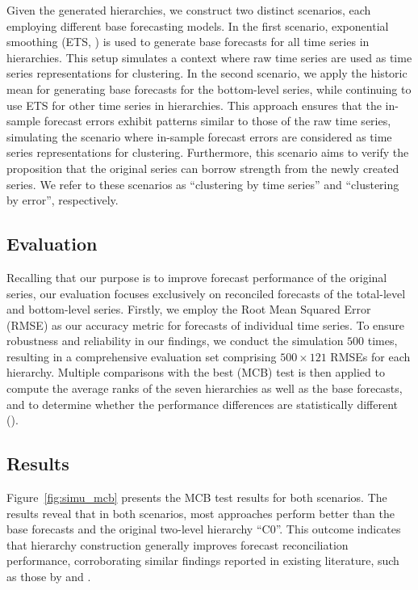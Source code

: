 \documentclass[a4paper,review,12pt,authoryear]{elsarticle}
\begin{document}
Given the generated hierarchies, we construct two distinct scenarios, each employing different base forecasting models. In the first scenario, exponential smoothing (ETS, \citealp{ForecastingExponentialSmoothing}) is used to generate base forecasts for all time series in hierarchies. This setup simulates a context where raw time series are used as time series representations for clustering.
In the second scenario, we apply the historic mean for generating base forecasts for the bottom-level series, while continuing to use ETS for other time series in hierarchies. This approach ensures that the in-sample forecast errors exhibit patterns similar to those of the raw time series, simulating the scenario where in-sample forecast errors are considered as time series representations for clustering. Furthermore, this scenario aims to verify the proposition that the original series can borrow strength from the newly created series. We refer to these scenarios as ``clustering by time series'' and ``clustering by error'', respectively. 


\subsection{Evaluation}
\label{sec:simu_eval}

Recalling that our purpose is to improve forecast performance of the original series, our evaluation focuses exclusively on reconciled forecasts of the total-level and bottom-level series. 
Firstly, we employ the Root Mean Squared Error (RMSE) as our accuracy metric for forecasts of individual time series. 
To ensure robustness and reliability in our findings, we conduct the simulation $500$ times, resulting in a comprehensive evaluation set comprising $500\times 121$ RMSEs for each hierarchy. 
Multiple comparisons with the best (MCB) test is then applied to compute the average ranks of the seven hierarchies as well as the base forecasts, and to determine whether the performance differences are statistically different (\citealp{tsutils}).


\subsection{Results}
\label{sec:simu_res}

Figure~\ref{fig:simu_mcb} presents the MCB test results for both scenarios. The results reveal that in both scenarios, most approaches perform better than the base forecasts and the original two-level hierarchy ``C0''. This outcome indicates that hierarchy construction generally improves forecast reconciliation performance, corroborating similar findings reported in existing literature, such as those by \cite{pangHierarchicalElectricityTime2022,liForecastReconciliationApproach2019} and \cite{matteraImprovingOutofSampleForecasts2023}.
\end{document}
